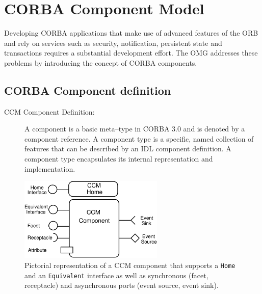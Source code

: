 \chapter{CORBA Component Model}

Developing CORBA applications that make use of advanced features of the 
ORB and rely on services such as security, notification, persistent state
and transactions requires a substantial development effort.
The OMG addresses these problems by introducing the concept of CORBA components.

\section{CORBA Component definition}
\begin{description} 
\item [CCM Component Definition:]
A component is a basic meta--type in CORBA 3.0 and is denoted by a component
reference.
A component type is a specific, named collection of features that can be
described by an IDL component definition.
A component type encapsulates its internal representation and implementation.
\end{description}

\begin{figure}[htbp]
    \begin{center}
    \includegraphics [height=4cm,angle=0] {figures/CCMSymbol}
    \caption{Pictorial representation of a CCM component that supports a {\tt Home}
    and an {\tt Equivalent} interface as well as synchronous (facet, receptacle)
    and asynchronous ports (event source, event sink).}
    \label{ComponentAndContainer}            
    \end{center}
\end{figure}

